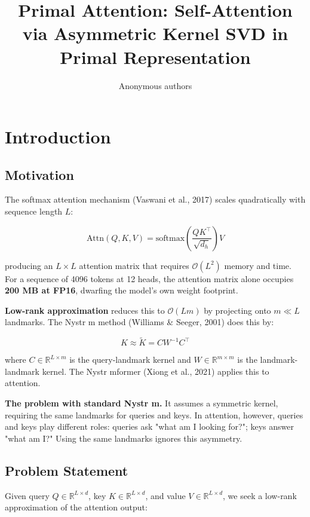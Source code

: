 \title{\textbf{Primal Attention: Self-Attention via Asymmetric Kernel SVD in Primal Representation}}

\author{Anonymous authors}



\section{Introduction}

\subsection{Motivation}

The softmax attention mechanism (Vaswani et al., 2017) scales quadratically 
with sequence length $L$:

\[
\text{Attn}(Q, K, V) = \text{softmax}\!\left(\frac{Q K^\top}{\sqrt{d_h}}\right) V
\]

producing an $L \times L$ attention matrix that requires $\mathcal{O}(L^2)$ 
memory and time. For a sequence of 4096 tokens at 12 heads, the attention 
matrix alone occupies \textbf{200 MB at FP16}, dwarfing the model's own weight 
footprint.

\textbf{Low-rank approximation} reduces this to $\mathcal{O}(L m)$ by projecting 
onto $m \ll L$ landmarks. The Nystr m method (Williams \& Seeger, 2001) does 
this by:

\[
K \approx \tilde{K} = C W^{-1} C^\top
\]

where $C \in \mathbb{R}^{L \times m}$ is the query-landmark kernel and 
$W \in \mathbb{R}^{m \times m}$ is the landmark-landmark kernel. The 
Nystr mformer (Xiong et al., 2021) applies this to attention.

\textbf{The problem with standard Nystr m.} It assumes a symmetric kernel, 
requiring the same landmarks for queries and keys. In attention, however, 
queries and keys play different roles: queries ask "what am I looking for?"; 
keys answer "what am I?" Using the same landmarks ignores this asymmetry.

\subsection{Problem Statement}

Given query $Q \in \mathbb{R}^{L \times d}$, key $K \in \mathbb{R}^{L \times d}$, 
and value $V \in \mathbb{R}^{L \times d}$, we seek a low-rank approximation 
of the attention output:


